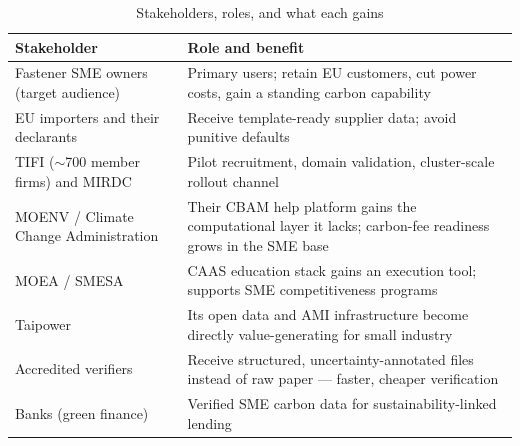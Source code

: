 \begin{table}[htbp]
\caption{Stakeholders, roles, and what each gains}
\label{tab:stakeholders}
\small
\begin{tabularx}{\textwidth}{@{}p{}X@{}}
\toprule
\textbf{Stakeholder} & \textbf{Role and benefit} \\
\midrule
Fastener SME owners (target audience) & Primary users; retain EU customers, cut power costs, gain a standing carbon capability \\
EU importers and their declarants & Receive template-ready supplier data; avoid punitive defaults\cite{omm} \\
TIFI ($\sim$700 member firms) and MIRDC & Pilot recruitment, domain validation, cluster-scale rollout channel\cite{goebel} \\
MOENV / Climate Change Administration & Their CBAM help platform\cite{tpt-cbam} gains the computational layer it lacks; carbon-fee readiness grows in the SME base \\
MOEA / SMESA & CAAS education stack\cite{caas} gains an execution tool; supports SME competitiveness programs \\
Taipower & Its open data and AMI infrastructure\cite{taipower,taipowerdata} become directly value-generating for small industry \\
Accredited verifiers & Receive structured, uncertainty-annotated files instead of raw paper --- faster, cheaper verification \\
Banks (green finance) & Verified SME carbon data for sustainability-linked lending \\
\bottomrule
\end{tabularx}
\end{table}
